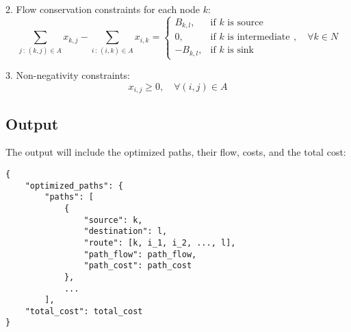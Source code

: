 \documentclass{article}
\begin{document}
2. Flow conservation constraints for each node \( k \):
\[
\sum_{j \,:\, (k,j) \in A} x_{k,j} - \sum_{i \,:\, (i,k) \in A} x_{i,k} = 
\begin{cases}
B_{k,l}, & \text{if } k \text{ is source} \\
0, & \text{if } k \text{ is intermediate} \\
-B_{k,l}, & \text{if } k \text{ is sink}
\end{cases}, \quad \forall k \in N
\]

3. Non-negativity constraints:
\[
x_{i,j} \geq 0, \quad \forall (i,j) \in A
\]

\subsection*{Output}
The output will include the optimized paths, their flow, costs, and the total cost:
\begin{verbatim}
{
    "optimized_paths": {
        "paths": [
            {
                "source": k,
                "destination": l,
                "route": [k, i_1, i_2, ..., l],
                "path_flow": path_flow,
                "path_cost": path_cost
            },
            ...
        ],
    "total_cost": total_cost
}
\end{verbatim}
\end{document}
